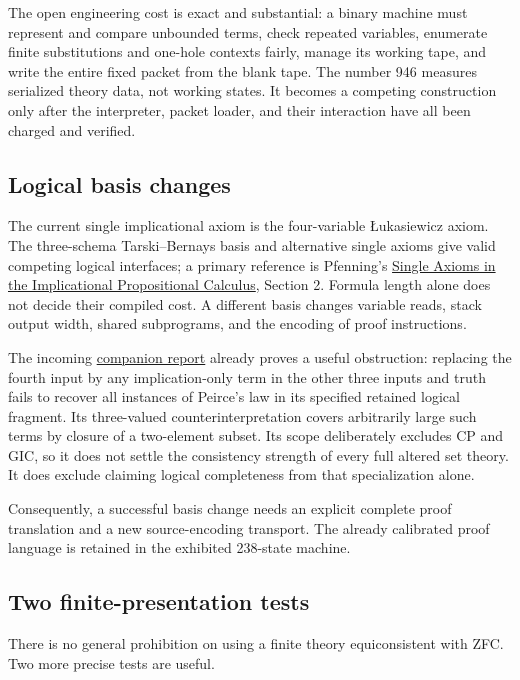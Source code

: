 The open engineering cost is exact and substantial: a binary machine
must represent and compare unbounded terms, check repeated variables,
enumerate finite substitutions and one-hole contexts fairly, manage its
working tape, and write the entire fixed packet from the blank tape.
The number 946 measures serialized theory data, not working states.
It becomes a competing construction only after the interpreter, packet
loader, and their interaction have all been charged and verified.

\subsection{Logical basis changes}

The current single implicational axiom is the four-variable
\L ukasiewicz axiom.  The three-schema Tarski--Bernays basis and alternative
single axioms give valid competing logical interfaces; a primary reference
is Pfenning's
\href{https://www.cs.cmu.edu/~fp/papers/cade88.pdf}
{Single Axioms in the Implicational Propositional Calculus}, Section 2.
Formula length alone does not decide their compiled cost.  A different
basis changes variable reads, stack output width, shared subprograms, and
the encoding of proof instructions.

The incoming
\href{https://github.com/VladimirReshetnikov/ProveIt/blob/ce192939372ac7944fe2a0208c68a96d49fb5e3b/docs/incoming/ZFC239_Companion_2026-10-19.zip}
{companion report} already proves a useful obstruction: replacing the
fourth input by any implication-only term in the other three inputs and
truth fails to recover all instances of Peirce's law in its specified
retained logical fragment.  Its three-valued counterinterpretation covers
arbitrarily large such terms by closure of a two-element subset.  Its
scope deliberately excludes CP and GIC, so it does not settle the
consistency strength of every full altered set theory.  It does exclude
claiming logical completeness from that specialization alone.

Consequently, a successful basis change needs an explicit complete
proof translation and a new source-encoding transport.  The already
calibrated proof language is retained in the exhibited 238-state machine.

\subsection{Two finite-presentation tests}

There is no general prohibition on using a finite theory equiconsistent
with ZFC.  Two more precise tests are useful.

